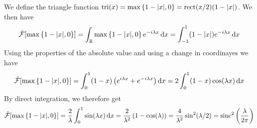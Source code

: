 \documentclass[../complete.tex]{subfiles}
\begin{document}
\begin{eg}
	We define the triangle function $\mathrm{tri}(x)=\max\left\{ 1-\abs{x},0 \right\}=\mathrm{rect}(x/2)(1-\abs{x})$. We then have
	\begin{equation*}
		\hat{\mathcal{F}}[\max\left\{ 1-\abs{x},0 \right\}]=\int_{\mathbb{R}}^{}\max\left\{ 1-\abs{x},0 \right\}e^{-i\lambda x}\operatorname{d\!} x=\int_{-1}^{1}(1-\abs{x})e^{-i\lambda x}\operatorname{d\!} x
	\end{equation*}
	Using the properties of the absolute value and using a change in coordinayes we have
	\begin{equation*}
		\hat{\mathcal{F}}[\max\left\{ 1-\abs{x},0 \right\}]=\int_{0}^{1}(1-x)\left( e^{i\lambda x}+e^{-i\lambda x} \right)\operatorname{d\!} x=2\int_{0}^{1}(1-x)\cos(\lambda x)\operatorname{d\!} x
	\end{equation*}
	By direct integration, we therefore get
	\begin{equation*}
		\hat{\mathcal{F}}[\max\left\{ 1-\abs{x},0 \right\}]=\frac{2}{\lambda}\int_{0}^{1}\sin(\lambda x)\operatorname{d\!} x=\frac{2}{\lambda^2}\left( 1-\cos(\lambda) \right)=\frac{4}{\lambda^2}\sin^2(\lambda/2)=\mathrm{sinc}^2\left( \frac{\lambda}{2\pi} \right)
	\end{equation*}
\end{eg}
\end{document}
